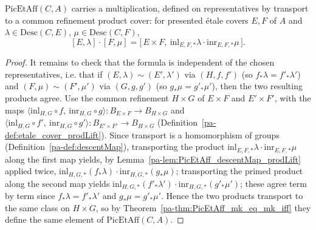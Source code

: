 \begin{theorem}[Multiplication]
  \label{pa-thm:PicEtAff_mk_mul_mk}
  \leanok

  \(\mathrm{PicEtAff}(C,A)\) carries a multiplication, defined on representatives by transport
  to a common refinement product cover: for presented \'etale covers \(E, F\) of \(A\) and
  \(\lambda \in \mathrm{Desc}(C,E)\), \(\mu \in \mathrm{Desc}(C,F)\),
  \[
    [E,\lambda] \cdot [F,\mu] = \bigl[\,E \times F,\ \mathrm{inl}_{E,F,*}\lambda \cdot
    \mathrm{inr}_{E,F,*}\mu\,\bigr].
  \]
\end{theorem}
\begin{proof}
  \leanok
  It remains to check that the formula is independent of the chosen representatives, i.e. that
  if \((E,\lambda) \sim (E',\lambda')\) via \((H,f,f')\) (so \(f_{*}\lambda = f'_{*}\lambda'\))
  and \((F,\mu) \sim (F',\mu')\) via \((G,g,g')\) (so \(g_{*}\mu = g'_{*}\mu'\)), then the two
  resulting products agree. Use the common refinement \(H \times G\) of \(E \times F\) and
  \(E' \times F'\), with the maps
  \(\langle \mathrm{inl}_{H,G} \circ f,\ \mathrm{inr}_{H,G} \circ g\rangle \colon B_{E \times F}
  \to B_{H \times G}\) and
  \(\langle \mathrm{inl}_{H,G} \circ f',\ \mathrm{inr}_{H,G} \circ g'\rangle \colon
  B_{E' \times F'} \to B_{H \times G}\)
  (Definition~\ref{pa-def:etale_cover_prodLift}). Since transport is a homomorphism of groups
  (Definition~\ref{pa-def:descentMap}), transporting the product
  \(\mathrm{inl}_{E,F,*}\lambda \cdot \mathrm{inr}_{E,F,*}\mu\) along the first map yields, by
  Lemma~\ref{pa-lem:PicEtAff_descentMap_prodLift} applied twice,
  \(\mathrm{inl}_{H,G,*}(f_{*}\lambda) \cdot \mathrm{inr}_{H,G,*}(g_{*}\mu)\); transporting the
  primed product along the second map yields
  \(\mathrm{inl}_{H,G,*}(f'_{*}\lambda') \cdot \mathrm{inr}_{H,G,*}(g'_{*}\mu')\); these agree
  term by term since \(f_{*}\lambda = f'_{*}\lambda'\) and \(g_{*}\mu = g'_{*}\mu'\). Hence the
  two products transport to the same class on \(H \times G\), so by
  Theorem~\ref{pa-thm:PicEtAff_mk_eq_mk_iff} they define the same element of
  \(\mathrm{PicEtAff}(C,A)\).
\end{proof}

